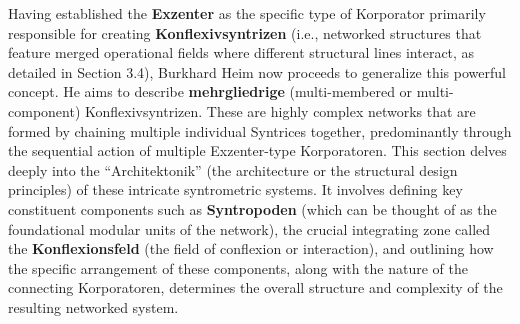 \documentclass[12pt]{article}
\newcommand{\q}[1]{\enquote{#1}}
\begin{document}
Having established the \textbf{Exzenter} as the specific type of Korporator primarily responsible for creating \textbf{Konflexivsyntrizen} (i.e., networked structures that feature merged operational fields where different structural lines interact, as detailed in Section 3.4), Burkhard Heim now proceeds to generalize this powerful concept. He aims to describe \textbf{mehrgliedrige} (multi-membered or multi-component) Konflexivsyntrizen. These are highly complex networks that are formed by chaining multiple individual Syntrices together, predominantly through the sequential action of multiple Exzenter-type Korporatoren. This section delves deeply into the \q{Architektonik} (the architecture or the structural design principles) of these intricate syntrometric systems. It involves defining key constituent components such as \textbf{Syntropoden} (which can be thought of as the foundational modular units of the network), the crucial integrating zone called the \textbf{Konflexionsfeld} (the field of conflexion or interaction), and outlining how the specific arrangement of these components, along with the nature of the connecting Korporatoren, determines the overall structure and complexity of the resulting networked system.
\end{document}

